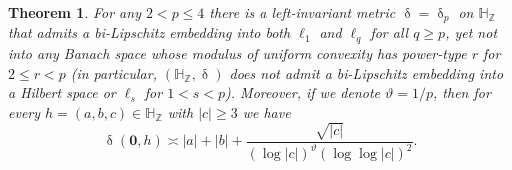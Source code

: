 \documentclass[11pt,reqno]{amsart}
\renewcommand{\H}{\mathbb{H}}
\newcommand{\Z}{\mathbb{Z}}
\newcommand{\0}{\mathbf{0}}
\renewcommand{\1}{\mathbf 1}
\renewcommand{\ge}{\geqslant}
\renewcommand{\le}{\leqslant}
\newtheorem{thm}{Theorem}[section]
\theoremstyle{remark}
\begin{document}
\begin{thm}\label{thm:invariant metric on two sides} For any $2<p\le 4$ there is a left-invariant metric $\updelta=\updelta_p$ on $\H_\Z$ that admits a bi-Lipschitz embedding into both $\ell_1$ and $\ell_q$ for all $q\ge p$, yet not into any Banach space whose modulus of uniform convexity has power-type $r$ for  $2\le r<p$ (in particular, $(\H_\Z,\updelta)$ does not admit a bi-Lipschitz embedding into a Hilbert space or $\ell_s$ for $1<s<p$). Moreover, if we denote $\vartheta=1/p$, then  for every $h=(a,b,c)\in \H_\Z$ with $|c|\ge 3$ we have
\begin{equation}\label{eq:updelta metric}
\updelta(\0,h)\asymp |a|+|b|+\frac{\sqrt{|c|}}{(\log |c|)^\vartheta (\log\log |c|)^2}.
\end{equation}
\end{thm}
\end{document}
